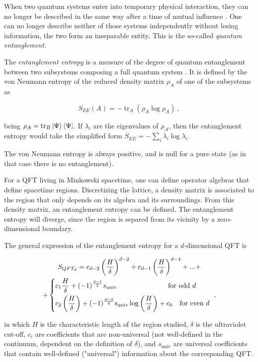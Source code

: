 \documentclass[twocolumn]{revtex4}
\providecommand{\eq}[2]{
    \begin{equation}
        #2
    \label{eq:#1}
    \end{equation}
}
\providecommand{\eqgat}[2]{
    \begin{gather}
        #2
    \label{eq:#1}
    \end{gather}
}
\DeclareMathOperator{\calA}{\mathcal{A}}
\DeclareMathOperator{\tr}{tr}
\begin{document}
When two quantum systems enter into temporary physical interaction, they can no longer be described in the same way after a time of mutual influence \cite{schrodinger_discussion_1935}. One can no longer describe neither of those systems independently without losing information, the two form an inseparable entity. This is the so-called \textit{quantum entanglement}.

The \textit{entanglement entropy} is a measure of the degree of quantum entanglement between two subsystems composing a full quantum system \cite{nishioka_entanglement_2018}. It is defined by the von Neumann entropy of the reduced density matrix $\rho_A$ of one of the subsystems as
\eq{EE}{
    S_{EE}(A) = - \tr_A ( \rho_A \log \rho_A ) \ ,
}
being $\rho_A = \tr_B \ket{\Psi}\bra{\Psi}$. If $\lambda_i$ are the eigenvalues of $\rho_{\calA}$, then the entanglement entropy would take the simplified form $S_{EE} = - \sum_i \lambda_i \log \lambda_i$.

The von Neumann entropy is always positive, and is null for a pure state (as in that case there is no entanglement).

For a QFT living in Minkowski spacetime, one can define operator algebras that define spacetime regions. Discretizing the lattice, a density matrix is associated to the region that only depends on its algebra and its surroundings. From this density matrix, an entanglement entropy can be defined. The entanglement entropy will diverge, since the region is separed from its vicinity by a zero-dimensional boundary.

The general expression of the entanglement entropy for a $d$-dimensional QFT is
\eqgat{EE}{
    S_{QFT_d} = c_{d-2} \left( \frac{H}{\delta} \right) ^{d-2} + c_{d-1} \left( \frac{H}{\delta} \right) ^{d-4} + ... + \nonumber \\
    + \begin{dcases}
        c_1 \frac{H}{\delta} + (-1)^{\frac{d-1}{2}} s_{\text{univ}}
        \qquad \qquad \qquad \quad \ \text{for odd } d \\
        c_2 \left ( \frac{H}{\delta} \right ) + (-1)^{\frac{d-2}{2}} s_{\text{univ}} \log \left ( \frac{H}{\delta} \right ) + c_0
        \quad \text{for even } d
    \end{dcases} \ ,
}
\cite{nishioka_entanglement_2018} in which $H$ is the characteristic length of the region studied, $\delta$ is the ultraviolet cut-off, $c_i$ are coefficients that are non-universal (not well-defined in the continuum, dependent on the definition of $\delta$), and $s_{\text{univ}}$ are universal coefficients that contain well-defined ("universal") information about the corresponding QFT.
\end{document}
